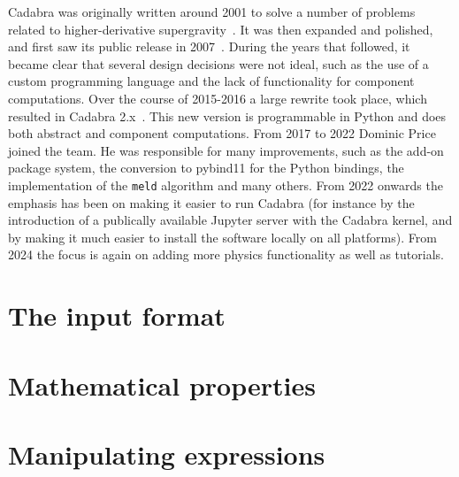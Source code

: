 \documentclass[11pt]{book}
\begin{document}
Cadabra was originally written around 2001 to solve a number of
problems related to higher-derivative
supergravity~\cite{Peeters:2000qj,Peeters:2003pv}. It was then
expanded and polished, and first saw its public release in
2007~\cite{kas_cdb_hep}.  During the years that followed, it became
clear that several design decisions were not ideal, such as the use of
a custom programming language and the lack of functionality for
component computations. Over the course of 2015-2016 a large rewrite
took place, which resulted in Cadabra 2.x~\cite{Peeters:2018dyg}.
This new version is programmable in Python and does both abstract and
component computations. From 2017 to 2022 Dominic Price joined the
team. He was responsible for many improvements, such as the add-on
package system, the conversion to pybind11 for the Python bindings,
the implementation of the {\tt meld} algorithm and many others. From
2022 onwards the emphasis has been on making it easier to run Cadabra
(for instance by the introduction of a publically available Jupyter
server with the Cadabra kernel, and by making it much easier to
install the software locally on all platforms). From 2024 the focus is
again on adding more physics functionality as well as tutorials.


\chapter{The input format}









\chapter{Mathematical properties}




\chapter{Manipulating expressions}






\end{document}
